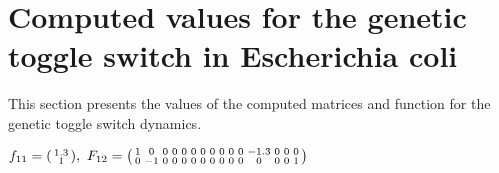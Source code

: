 \documentclass[fleqn]{article}
\begin{document}

\clearpage
\section{Computed values for the genetic toggle switch in Escherichia coli}
\label{App:Genetic_toggle_switch_values}
This section presents the values of the computed matrices and function for the genetic toggle switch dynamics.

\bigskip

$
f_{11} = \spmqty{ 1.3 \\ 1 },~
F_{12} = \spmqty{ 1 & 0 & 0 & 0 & 0 & 0 & 0 & 0 & 0 & 0 & 0 & -1.3 & 0 & 0 & 0 \\ 0 & -1 & 0 & 0 & 0 & 0 & 0 & 0 & 0 & 0 & 0 & 0 & 0 & 0 & 1 }
$

\bigskip
\end{document}
